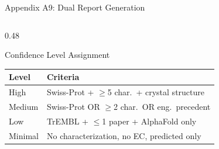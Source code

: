 \documentclass[aspectratio=169, 11pt]{beamer}
\begin{document}
\begin{frame}{Appendix A9: Dual Report Generation}
\begin{columns}[T]
\begin{column}{0.48\textwidth}
\vspace{2pt}
\begin{exampleblock}{\small Confidence Level Assignment}
\vspace{-2pt}
{\scriptsize
\begin{tabular}{@{}l p{4.5cm}@{}}
\toprule
\textbf{Level} & \textbf{Criteria} \\
\midrule
High & Swiss-Prot + $\geq$5 char.\ + crystal structure \\
Medium & Swiss-Prot OR $\geq$2 char.\ OR eng.\ precedent \\
Low & TrEMBL + $\leq$1 paper + AlphaFold only \\
Minimal & No characterization, no EC, predicted only \\
\bottomrule
\end{tabular}
}
\end{exampleblock}
\end{column}
\end{columns}
\end{frame}
\end{document}
